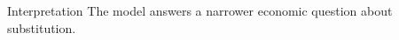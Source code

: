 \documentclass{beamer}
\begin{document}
\begin{frame}{Interpretation}
The model answers a narrower economic question about substitution.
\end{frame}
\end{document}
